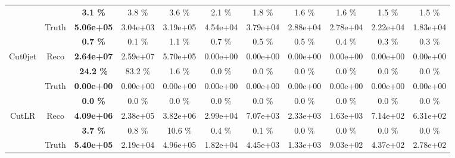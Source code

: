 \begin{appendices}
\begin{landscape}
\begin{table}
\begin{tabular}{|c|c|>{\bfseries}c|c|c|c|c|c|c|c|c|}
                                    &                           & 3.1 \%   & 3.8 \%   & 3.6 \%   & 2.1 \%   & 1.8 \%   & 1.6 \%   & 1.6 \%   & 1.5 \%   & 1.5 \%   \\
    \cline{2-11}                                                                                    
                                    & \multirow{2}{*}{Truth}    & 5.06e+05 & 3.04e+03 & 3.19e+05 & 4.54e+04 & 3.79e+04 & 2.88e+04 & 2.78e+04 & 2.22e+04 & 1.83e+04 \\
                                    &                           & 0.7 \%   & 0.1 \%   & 1.1 \%   & 0.7 \%   & 0.5 \%   & 0.5 \%   & 0.4 \%   & 0.3 \%   & 0.3 \%   \\
    \hline                                                                                      
    \hline                                                                                      
    \multirow{4}{*}{Cut0jet}        & \multirow{2}{*}{Reco}   & 2.64e+07 & 2.59e+07 & 5.70e+05 & 0.00e+00 & 0.00e+00 & 0.00e+00 & 0.00e+00 & 0.00e+00 & 0.00e+00 \\
                                    &                           & 24.2 \%  & 83.2 \%  & 1.6 \%   & 0.0 \%   & 0.0 \%   & 0.0 \%   & 0.0 \%   & 0.0 \%   & 0.0 \%   \\
    \cline{2-11}                                                                                    
                                    & \multirow{2}{*}{Truth}    & 0.00e+00 & 0.00e+00 & 0.00e+00 & 0.00e+00 & 0.00e+00 & 0.00e+00 & 0.00e+00 & 0.00e+00 & 0.00e+00 \\
                                    &                           & 0.0 \%   & 0.0 \%   & 0.0 \%   & 0.0 \%   & 0.0 \%   & 0.0 \%   & 0.0 \%   & 0.0 \%   & 0.0 \%   \\
    \hline                                                                                      
    \hline                                                                                      
    \multirow{4}{*}{CutLR}          & \multirow{2}{*}{Reco}   & 4.09e+06 & 2.38e+05 & 3.82e+06 & 2.99e+04 & 7.07e+03 & 2.33e+03 & 1.63e+03 & 7.14e+02 & 6.31e+02 \\
                                    &                           & 3.7 \%   & 0.8 \%   & 10.6 \%  & 0.4 \%   & 0.1 \%   & 0.0 \%   & 0.0 \%   & 0.0 \%   & 0.0 \%   \\
    \cline{2-11}                                                                                    
                                    & \multirow{2}{*}{Truth}    & 5.40e+05 & 2.19e+04 & 4.96e+05 & 1.82e+04 & 4.45e+03 & 1.33e+03 & 9.03e+02 & 4.37e+02 & 2.78e+02 \\

\end{tabular}
\end{table}
\end{landscape}
\end{appendices}
